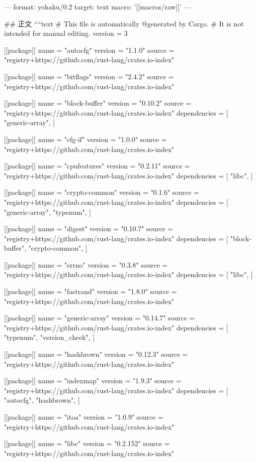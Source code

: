 ---
format: yohaku/0.2
target: text
macro: '[[macros/raw]]'
---

## 正文
````text
# This file is automatically @generated by Cargo.
# It is not intended for manual editing.
version = 3

[[package]]
name = "autocfg"
version = "1.1.0"
source = "registry+https://github.com/rust-lang/crates.io-index"

[[package]]
name = "bitflags"
version = "2.4.2"
source = "registry+https://github.com/rust-lang/crates.io-index"

[[package]]
name = "block-buffer"
version = "0.10.2"
source = "registry+https://github.com/rust-lang/crates.io-index"
dependencies = [
 "generic-array",
]

[[package]]
name = "cfg-if"
version = "1.0.0"
source = "registry+https://github.com/rust-lang/crates.io-index"

[[package]]
name = "cpufeatures"
version = "0.2.11"
source = "registry+https://github.com/rust-lang/crates.io-index"
dependencies = [
 "libc",
]

[[package]]
name = "crypto-common"
version = "0.1.6"
source = "registry+https://github.com/rust-lang/crates.io-index"
dependencies = [
 "generic-array",
 "typenum",
]

[[package]]
name = "digest"
version = "0.10.7"
source = "registry+https://github.com/rust-lang/crates.io-index"
dependencies = [
 "block-buffer",
 "crypto-common",
]

[[package]]
name = "errno"
version = "0.3.8"
source = "registry+https://github.com/rust-lang/crates.io-index"
dependencies = [
 "libc",
]

[[package]]
name = "fastrand"
version = "1.8.0"
source = "registry+https://github.com/rust-lang/crates.io-index"

[[package]]
name = "generic-array"
version = "0.14.7"
source = "registry+https://github.com/rust-lang/crates.io-index"
dependencies = [
 "typenum",
 "version_check",
]

[[package]]
name = "hashbrown"
version = "0.12.3"
source = "registry+https://github.com/rust-lang/crates.io-index"

[[package]]
name = "indexmap"
version = "1.9.3"
source = "registry+https://github.com/rust-lang/crates.io-index"
dependencies = [
 "autocfg",
 "hashbrown",
]

[[package]]
name = "itoa"
version = "1.0.9"
source = "registry+https://github.com/rust-lang/crates.io-index"

[[package]]
name = "libc"
version = "0.2.152"
source = "registry+https://github.com/rust-lang/crates.io-index"

